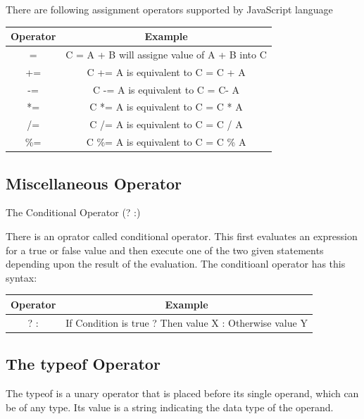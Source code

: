 \documentclass[11pt,a4paper]{article}
\begin{document}
There are following assignment operators supported by JavaScript language

\begin{table}[ht]
\begin{center}
\begin{tabular}{| c | c |} \hline
\textbf{Operator} & \textbf{Example}\\ \hline
= &  C = A + B will assigne value of A + B into C\\ \hline
+= & C += A is equivalent to C = C + A\\ \hline
-= & C -= A is equivalent to C = C- A\\ \hline
*= & C *= A is equivalent to C = C * A\\ \hline
/= & C /= A is equivalent to C = C / A\\ \hline
\%= & C \%= A is equivalent to C = C \% A\\ \hline
\end{tabular}
\end{center}
\end{table}

\subsection*{Miscellaneous Operator}

The Conditional Operator (? :)

There is an oprator called conditional operator. This first evaluates an expression for a true or false value and then execute one of the two given statements depending upon the result of the evaluation. The conditioanl operator has this syntax:
\begin{table}[ht]
\begin{center}
\begin{tabular}{| c | c |} \hline
\textbf{Operator} & \textbf{Example}\\ \hline
? : & If Condition is true ? Then value X : Otherwise value Y\\ \hline
\end{tabular}
\end{center}
\end{table}

\subsection*{The typeof Operator}

The typeof is a unary operator that is placed before its single operand, which can be of any type. Its value is a string indicating the data type of the operand.
\end{document}
